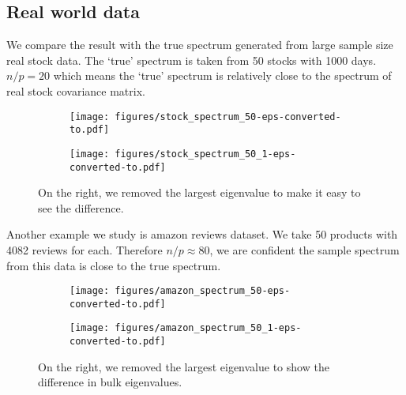 \documentclass[12pt]{extarticle}
\newcommand{\1}{\field{1}}
\numberwithin{equation}{section}
\begin{document}
\subsection{Real world data}
We compare the result with the true spectrum generated from large sample size real stock data. The `true' spectrum is taken from  50 stocks with 1000 days. $n/p = 20$ which means the `true' spectrum is relatively close to the spectrum of real stock covariance matrix.
 
\begin{figure}[H] 
\centering
	\begin{subfigure}[t]{.45\textwidth}
		\centering
		\texttt{[image: figures/stock\_spectrum\_50-eps-converted-to.pdf]}
	\end{subfigure}
	\begin{subfigure}[t]{.45\textwidth}
		\centering
		\texttt{[image: figures/stock\_spectrum\_50\_1-eps-converted-to.pdf]}
	\end{subfigure}
	\caption{On the right, we removed the largest eigenvalue to make it easy to see the difference.}
\end{figure}

Another example we study is amazon reviews dataset. We take 50 products with 4082 reviews for each. Therefore $n/p \approx 80$, we are confident the sample spectrum from this data is close to the true spectrum.
\begin{figure}[H] 
\centering
	\begin{subfigure}[t]{.45\textwidth}
		\centering
		\texttt{[image: figures/amazon\_spectrum\_50-eps-converted-to.pdf]}
	\end{subfigure}
	\begin{subfigure}[t]{.45\textwidth}
		\centering
		\texttt{[image: figures/amazon\_spectrum\_50\_1-eps-converted-to.pdf]}
	\end{subfigure}
	\caption{On the right, we removed the largest eigenvalue to show the difference in bulk eigenvalues.}
\end{figure}


\end{document}

